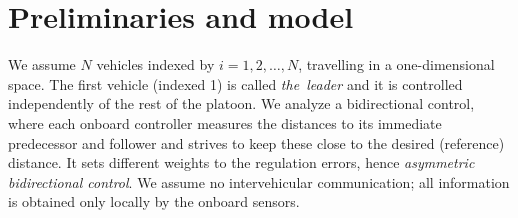 \documentclass[technote, 10pt, twoside]{IEEEtran}
\newcommand{\numVeh}{N}
\theoremstyle{plain}
\theoremstyle{definition}
\theoremstyle{assump}
\begin{document}
\section{Preliminaries and model}
We assume $\numVeh$ vehicles indexed by $i=1,2, \ldots, \numVeh$, travelling in
a one-dimensional space. The first vehicle (indexed 1) is called
\textit{the~leader} and it is controlled independently of the rest of the
platoon. We analyze a bidirectional control, where each onboard controller
measures the distances to its immediate predecessor and follower and strives
to keep these close to the desired (reference) distance. It sets different
weights to the  regulation errors, hence \textit{asymmetric bidirectional
control}. We assume no intervehicular communication; all information is obtained
only locally by the onboard sensors.
\end{document}
